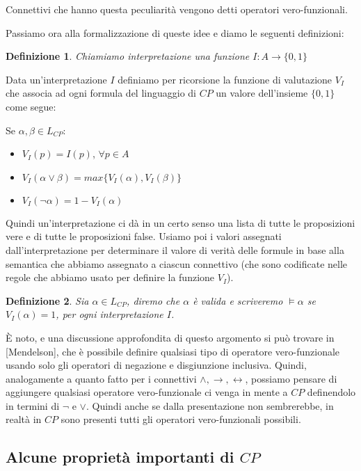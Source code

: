\documentclass[a4paper, titlepage, 12pt]{report}
\newtheorem{definition}{Definizione}
\begin{document}
Connettivi che hanno questa peculiarità vengono detti operatori vero-funzionali.

Passiamo ora alla formalizzazione di queste idee e diamo le seguenti definizioni:

\begin{definition}
Chiamiamo interpretazione una funzione $I: A \to \{0, 1\}$
\end{definition}

Data un'interpretazione $I$ definiamo per ricorsione la funzione di valutazione $V_I$ che associa ad ogni formula
del linguaggio di $CP$ un valore dell'insieme $\{0, 1\}$ come segue:

Se $\alpha, \beta \in L_{CP}$:
\begin{itemize}
\item $V_I(p) = I(p)$, $\forall p \in A$
\item $V_I(\alpha \lor \beta) = max\{V_I(\alpha), V_I(\beta)\}$
\item $V_I(\neg \alpha) = 1 - V_I(\alpha)$
\end{itemize}


Quindi un'interpretazione ci dà in un certo senso una lista di tutte le proposizioni
vere e di tutte le proposizioni false.
Usiamo poi i valori assegnati dall'interpretazione per determinare il valore di verità delle formule
in base alla semantica che abbiamo assegnato a ciascun connettivo (che sono codificate nelle regole
che abbiamo usato per definire la funzione $V_I$).

\begin{definition}
Sia $\alpha \in L_{CP}$, diremo che $\alpha$ è valida e scriveremo $\vDash \alpha$ se
$V_I(\alpha) = 1$, per ogni interpretazione $I$.
\end{definition}

È noto, e una discussione approfondita di questo argomento si può trovare in [Mendelson],
che è possibile definire qualsiasi tipo di operatore vero-funzionale usando
solo gli operatori di negazione e disgiunzione inclusiva.
Quindi, analogamente a quanto fatto per i connettivi $\land, \rightarrow, \leftrightarrow$,
possiamo pensare di aggiungere qualsiasi operatore vero-funzionale ci venga in mente
a $CP$ definendolo in termini di $\neg$ e $\lor$.
Quindi anche se dalla presentazione non sembrerebbe, in realtà in $CP$ sono presenti
tutti gli operatori vero-funzionali possibili.

\subsection{Alcune proprietà importanti di $CP$}
\end{document}
